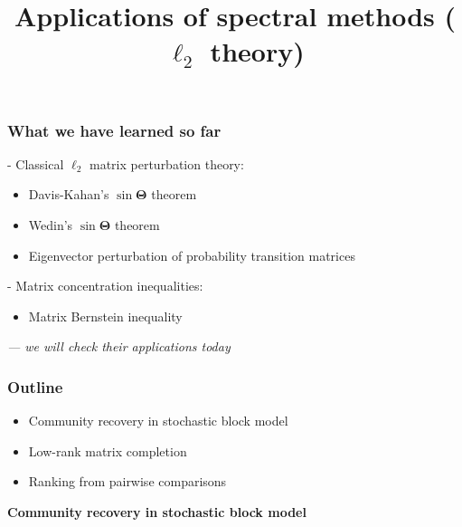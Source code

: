 \documentclass[compress,
mathserif,wide,%
]{beamer}
\title %
{Applications of spectral methods ($\ell_{2}$ theory)}
\begin{document}
\begin{frame}[plain]
  \titlepage

\end{frame}

\begin{frame}
	\frametitle{What we have learned so far}
	
	- Classical $\ell_{2}$ matrix perturbation theory: 
	\begin{itemize}
		\item Davis-Kahan's $\sin \bm{\Theta}$ theorem 				\item Wedin's $\sin \bm{\Theta}$ theorem 		
		\item Eigenvector perturbation of probability transition matrices
	\end{itemize}
	
	\vfill 
	- Matrix concentration inequalities:
	\begin{itemize}
		\item Matrix Bernstein inequality
	\end{itemize}
	
	\vfill
	\pause
	{\hfill \em --- we will check their applications today}
\end{frame}

\begin{frame}
\frametitle{Outline}

\begin{itemize}
  \itemsep1em
  \item Community recovery in stochastic block model
  \item Low-rank matrix completion
  \item Ranking from pairwise comparisons
\end{itemize}

\end{frame}


\begin{frame}[plain]
	\vfill
	\centering
	\large \bf Community recovery in stochastic block model
	\vfill
\end{frame}
\end{document}
